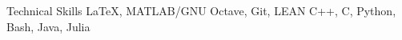 \begin{rubric}{Technical Skills}
    \entry*[Software] \LaTeX, MATLAB/GNU Octave, Git, LEAN%
	\entry*[Programming] C++, C, Python, Bash, Java, Julia%
\end{rubric}